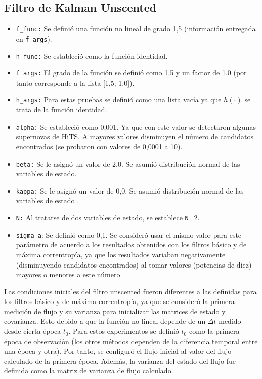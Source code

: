 \subsection*{Filtro de Kalman Unscented}
\begin{itemize}
\item \texttt{f\_func:} Se defini\'o una funci\'on no lineal de grado 1,5 (informaci\'on entregada en \texttt{f\_args}).
\item \texttt{h\_func:} Se estableci\'o como la funci\'on identidad.
\item \texttt{f\_args:} El grado de la funci\'on se defini\'o como 1,5 y un factor de 1,0 (por tanto corresponde a la lista [1,5; 1,0]).
\item \texttt{h\_args:} Para estas pruebas se defini\'o como una lista vac\'ia ya que $h(\cdot)$ se trata de la funci\'on identidad.
\item \texttt{alpha:} Se estableci\'o como 0,001. Ya que con este valor se detectaron algunas supernovas de HiTS. A mayores valores disminuyen el n\'umero de candidatos encontrados (se probaron con valores de 0,0001 a 10).
\item \texttt{beta:} Se le asign\'o un valor de 2,0. Se asumi\'o distribuci\'on normal de las variables de estado\cite{matsinos}. 
\item \texttt{kappa:} Se le asign\'o un valor de 0,0. Se asumi\'o distribuci\'on normal de las variables de estado \cite{matsinos}.
\item \texttt{N:} Al tratarse de dos variables de estado, se establece \texttt{N}=2.
\item \texttt{sigma\_a}: Se defini\'o como 0,1. Se consider\'o usar el mismo valor para este par\'ametro de acuerdo a los resultados obtenidos con los filtros b\'asico y de m\'axima correntrop\'ia, ya que los resultados variaban negativamente (disminuyendo candidatos encontrados) al tomar valores (potencias de diez) mayores o menores a este n\'umero.    
\end{itemize}
Las condiciones iniciales del filtro unscented fueron diferentes a las definidas para los filtros b\'asico y de m\'axima correntrop\'ia, ya que se consider\'o la primera medici\'on de flujo y su varianza para inicializar las matrices de estado y covarianza. Esto debido a que la funci\'on no lineal depende de un $\Delta t$ medido desde cierta \'epoca $t_0$. Para estos experimentos se defini\'o $t_0$ como la primera \'epoca de observaci\'on (los otros m\'etodos dependen de la diferencia temporal entre una \'epoca y otra). Por tanto, se configur\'o el flujo inicial al valor del flujo calculado de la primera \'epoca. Adem\'as, la varianza del estado del flujo fue definida como la matriz de varianza de flujo calculado.


